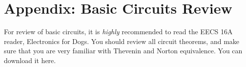 \chapter{Appendix: Basic Circuits Review}
For review of basic circuits, it is \emph{highly} recommended to read the EECS 16A reader, Electronics for Dogs.  You should review all circuit theorems, and make sure that you are very familiar with Thevenin and Norton equivalence.  You can download it here.
